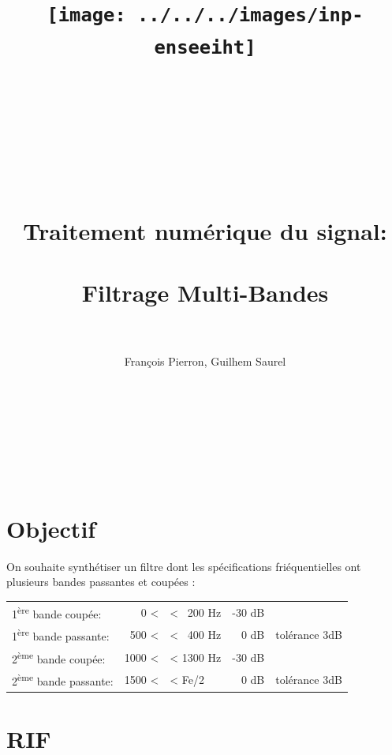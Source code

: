 \documentclass{article}
\title{\texttt{[image: ../../../images/inp-enseeiht]} \\ ~ \\ ~ \\ ~ \\ ~ \\ ~ \\ Traitement numérique du signal: \\ ~ \\ Filtrage Multi-Bandes \\ ~}
\author{François Pierron, Guilhem Saurel}
\date{\oldstylenums{\today}}
\begin{document}
\begin{titlepage}
    \setcounter{page}{0}
    \maketitle
    \thispagestyle{empty}

    ~

    ~

    ~
    \tableofcontents
\end{titlepage}


\section{Objectif}

On souhaite synthétiser un filtre dont les spécifications friéquentielles ont plusieurs bandes passantes et coupées :

\begin{tabular}{lrlrl}
    1\textsuperscript{ère} bande coupée:   &    0 < & < ~200 \si\hertz & -30 dB &  \\
    1\textsuperscript{ère} bande passante: &  500 < & < ~400 \si\hertz &   0 dB & tolérance 3dB \\
    2\textsuperscript{ème} bande coupée:   & 1000 < & < 1300 \si\hertz & -30 dB &  \\
    2\textsuperscript{ème} bande passante: & 1500 < & <           Fe/2 &   0 dB & tolérance 3dB \\
\end{tabular}

\section{RIF}
\end{document}
